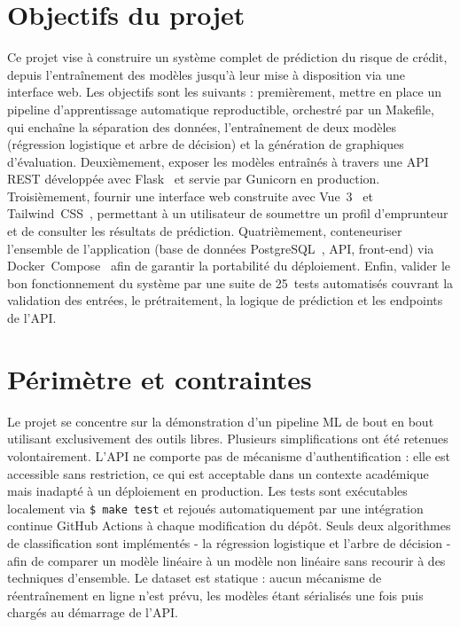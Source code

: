 \documentclass[12pt,a4paper,openany]{report}
\newcommand{\cmd}[1]{\texttt{\$ #1}}
\begin{document}
\section{Objectifs du projet}

Ce projet vise à construire un système complet de prédiction du risque de crédit, depuis l'entraînement des modèles jusqu'à leur mise à disposition via une interface web. Les objectifs sont les suivants : premièrement, mettre en place un pipeline d'apprentissage automatique reproductible, orchestré par un Makefile, qui enchaîne la séparation des données, l'entraînement de deux modèles (régression logistique et arbre de décision) et la génération de graphiques d'évaluation. Deuxièmement, exposer les modèles entraînés à travers une API REST développée avec Flask~\cite{flask} et servie par Gunicorn en production. Troisièmement, fournir une interface web construite avec Vue~3~\cite{vuejs} et Tailwind~CSS~\cite{tailwindcss}, permettant à un utilisateur de soumettre un profil d'emprunteur et de consulter les résultats de prédiction. Quatrièmement, conteneuriser l'ensemble de l'application (base de données PostgreSQL~\cite{postgresql}, API, front-end) via Docker~Compose~\cite{dockercompose} afin de garantir la portabilité du déploiement. Enfin, valider le bon fonctionnement du système par une suite de 25~tests automatisés couvrant la validation des entrées, le prétraitement, la logique de prédiction et les endpoints de l'API.

\section{Périmètre et contraintes}

Le projet se concentre sur la démonstration d'un pipeline ML de bout en bout utilisant exclusivement des outils libres. Plusieurs simplifications ont été retenues volontairement. L'API ne comporte pas de mécanisme d'authentification : elle est accessible sans restriction, ce qui est acceptable dans un contexte académique mais inadapté à un déploiement en production. Les tests sont exécutables localement via \cmd{make test} et rejoués automatiquement par une intégration continue GitHub Actions à chaque modification du dépôt. Seuls deux algorithmes de classification sont implémentés - la régression logistique et l'arbre de décision - afin de comparer un modèle linéaire à un modèle non linéaire sans recourir à des techniques d'ensemble. Le dataset est statique : aucun mécanisme de réentraînement en ligne n'est prévu, les modèles étant sérialisés une fois puis chargés au démarrage de l'API.
\end{document}
